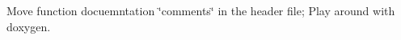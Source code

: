 Move function docuemntation \char`\"{}comments\char`\"{} in the header file; Play around with doxygen. 